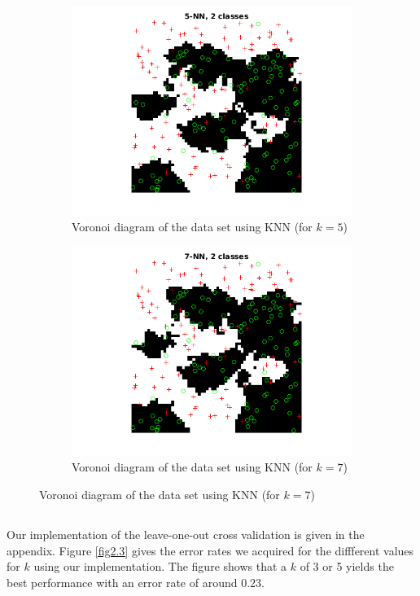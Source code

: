 \documentclass[10pt]{article}
\begin{document}
\begin{figure}[H]
\begin{subfigure}{.48\textwidth}
    \label{fig2.1b}
  \end{subfigure}
  \begin{subfigure}{.48\textwidth}
    \includegraphics[width=1\textwidth]{assign2_2_5.png}
    \caption{Voronoi diagram of the data set using KNN (for $k=5$)}
    \label{fig2.1c}
  \end{subfigure}
  \begin{subfigure}{.48\textwidth}
    \includegraphics[width=1\textwidth]{assign2_2_7.png}
    \caption{Voronoi diagram of the data set using KNN (for $k=7$)}
    \label{fig2.1d}
  \end{subfigure}
\end{figure}

\subsection{}
Our implementation of the leave-one-out cross validation is given in the appendix. Figure \ref{fig2.3} gives the error rates we acquired for the diffferent values for $k$ using our implementation. The figure shows that a $k$ of 3 or 5 yields the best performance with an error rate of around 0.23.
\end{document}
